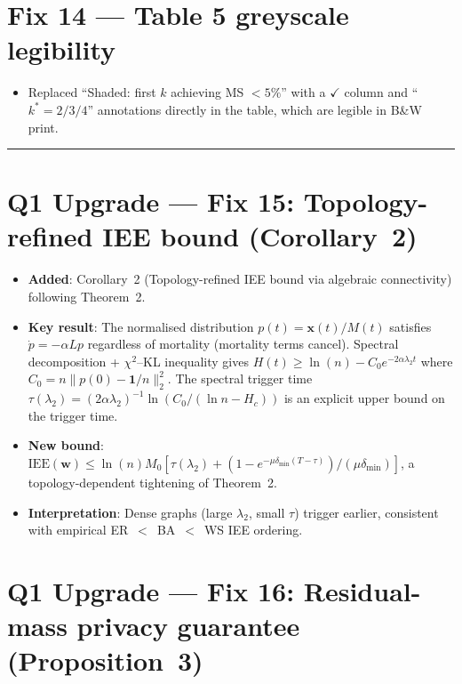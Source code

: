 \documentclass[11pt,a4paper]{article}
\begin{document}
\section*{Fix 14 — Table 5 greyscale legibility}

\begin{itemize}
\item Replaced ``Shaded: first $k$ achieving MS $<5\%$'' with a
  $\checkmark$ column and ``$k^*=2/3/4$'' annotations directly in the
  table, which are legible in B\&W print.
\end{itemize}

\bigskip
\noindent\rule{\linewidth}{0.4pt}

\section*{Q1 Upgrade — Fix 15: Topology-refined IEE bound (Corollary~2)}

\begin{itemize}
\item \textbf{Added}: Corollary~2 (Topology-refined IEE bound via algebraic
  connectivity) following Theorem~2.
\item \textbf{Key result}: The normalised distribution $p(t)=\mathbf{x}(t)/M(t)$
  satisfies $\dot{p}=-\alpha Lp$ regardless of mortality (mortality terms
  cancel). Spectral decomposition + $\chi^2$--KL inequality gives
  $H(t) \geq \ln(n) - C_0 e^{-2\alpha\lambda_2 t}$ where $C_0 = n\|p(0)-\mathbf{1}/n\|_2^2$.
  The spectral trigger time $\tau(\lambda_2) = (2\alpha\lambda_2)^{-1}
  \ln(C_0/(\ln n - H_c))$ is an explicit upper bound on the trigger time.
\item \textbf{New bound}: $\mathrm{IEE}(\mathbf{w}) \leq \ln(n)M_0
  [\tau(\lambda_2) + (1-e^{-\mu\delta_{\min}(T-\tau)})/(\mu\delta_{\min})]$,
  a topology-dependent tightening of Theorem~2.
\item \textbf{Interpretation}: Dense graphs (large $\lambda_2$, small $\tau$)
  trigger earlier, consistent with empirical ER~$<$~BA~$<$~WS IEE ordering.
\end{itemize}

\section*{Q1 Upgrade — Fix 16: Residual-mass privacy guarantee (Proposition~3)}
\end{document}
